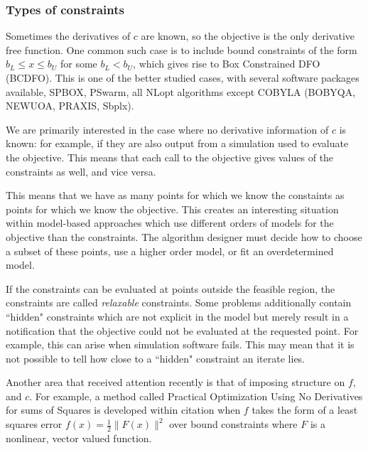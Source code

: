 \documentclass{article}
\begin{document}
\subsubsection{Types of constraints}

Sometimes the derivatives of $c$ are known, so the objective is the only derivative free function.
One common such case is to include bound constraints of the form $b_{L} \le x \le b_{U}$ for some $b_{L} < b_{U}$, which gives rise to Box Constrained DFO (BCDFO).
This is one of the better studied cases, with several software packages available, SPBOX, PSwarm, all NLopt algorithms except COBYLA (BOBYQA, NEWUOA, PRAXIS, Sbplx).


We are primarily interested in the case where no derivative information of $c$ is known: for example, if they are also output from a simulation used to evaluate the objective.
This means that each call to the objective gives values of the constraints as well, and vice versa.

This means that we have as many points for which we know the constaints as points for which we know the objective.
This creates an interesting situation within model-based approaches which use different orders of models for the objective than the constraints.
The algorithm designer must decide how to choose a subset of these points, use a higher order model, or fit an overdetermined model.

If the constraints can be evaluated at points outside the feasible region, the constraints are called \emph{relaxable} constraints.
Some problems additionally contain ``hidden" constraints which are not explicit in the model but merely result in a notification that the objective could not be evaluated at the requested point.
For example, this can arise when simulation software fails.
This may mean that it is not possible to tell how close to a ``hidden" constraint an iterate lies.


Another area that received attention recently is that of imposing structure on $f$, and $c$.
For example, a method called Practical Optimization Using No Derivatives for sums of Squares
is developed within \color{red}citation\color{black} %
when $f$ takes the form of a least squares error
$f(x) = \frac 1 2 \|F(x)\|^2$ over bound constraints where $F$ is a nonlinear, vector valued function.

\end{document}
